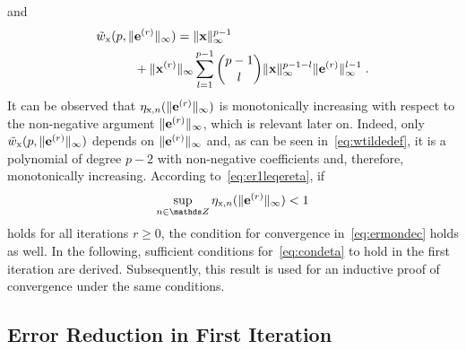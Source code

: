 \documentclass[10pt,twocolumn,twoside]{IEEEtran}
\begin{document}
and
\begin{align}
	\begin{split}
	&\tilde{w}_{\mathrm{x}}(p,\lVert\bm{\mathrm{e}}^{(r)}\rVert_\infty) = \lVert\bm{\mathrm{x}}\rVert_\infty^{p-1} \\
		&\quad\qquad+ \lVert\bm{\mathrm{x}}^{(r)}\rVert_\infty
				\sum_{l=1}^{p-1} \binom{p-1}{l} \lVert\bm{\mathrm{x}}\rVert_\infty^{p-1-l}\lVert\bm{\mathrm{e}}^{(r)}\rVert_\infty^{l-1}\;.
	\end{split}
	\label{eq:wtildedef}
\end{align}
It can be observed that $\eta_{\mathrm{x},n}(\lVert\bm{\mathrm{e}}^{(r)}\rVert_\infty)$ is monotonically
increasing with respect to the non-negative argument $\lVert\bm{\mathrm{e}}^{(r)}\rVert_\infty$,
which is relevant later on. Indeed, only
$\tilde{w}_{\mathrm{x}}(p,\lVert\bm{\mathrm{e}}^{(r)}\rVert_\infty)$ depends on $\lVert\bm{\mathrm{e}}^{(r)}\rVert_\infty$
and, as can be seen in~\eqref{eq:wtildedef}, it is a polynomial of degree $p-2$ with
non-negative coefficients and, therefore, monotonically increasing.
According to~\eqref{eq:er1leqereta}, if
\begin{align}
	\sup_{n\in\Z} \seta{x}{n}(\norminf{\vm{e}^{(r)}}) < 1
	\label{eq:condeta}
\end{align}
holds for all iterations $r\geq 0$,
the condition for convergence in~\eqref{eq:ermondec} holds as well. In the
following, sufficient conditions for~\eqref{eq:condeta} to hold in the
first iteration are derived. Subsequently,
this result is used for an inductive proof of convergence under the same conditions.


\subsection{Error Reduction in First Iteration}
	\label{ccderi1:base}
	
\end{document}
